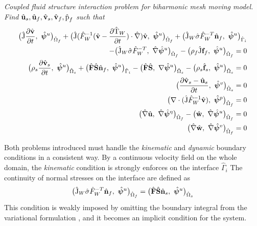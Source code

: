 \begin{prob}
\textit{Coupled fluid structure interaction problem for biharmonic mesh moving model.
Find $\hat{\mathbf{u}}_s, \hat{\mathbf{u}}_f, \hat{\mathbf{v}}_s, \hat{\mathbf{v}}_f, \text{\^{p}}_f $ such that}
\begin{align*}
\big(\text{\^{J}} \frac{\partial \hat{\mathbf{v}}}{\partial t}, \ \hat{\bm{\psi}}^u \big)_{\hat{\Omega}_f} +
\big(\text{\^{J}} (\hat{F}_W^{-1}(\hat{\mathbf{v}} - \frac{\partial \text{\^{T}}_W}{\partial t}) \cdot \hat{\nabla}) \hat{\mathbf{v}}, \ {\hat{\bm{\psi}}^u} \big)_{\hat{\Omega}_f}
+ \big(\text{\^{J}}_W \hat{\sigma}\hat{F}_W^{-T} \hat{\mathbf{n}}_f, \ {\hat{\bm{\psi}}^u} \big)_{\hat{\Gamma}_i} \\
- \big(\text{\^{J}}_W \hat{\sigma}\hat{F}_W^{-T}, \ {\hat{\nabla}\hat{\bm{\psi}}^u} \big)_{\hat{\Omega}_f} -
\big(\rho_f \text{\^{J}} \mathbf{f}_f, \ {{\hat{\bm{\psi}}^u}} \big)_{\hat{\Omega}_f} = 0 \\
\big(\rho_s \frac{\partial \hat{\mathbf{v}}_s}{\partial t}, \ {\hat{\bm{\psi}}^u} \big)_{\hat{\Omega}_s} + \big(\hat{\mathbf{F}}\hat{\mathbf{S}}\hat{\mathbf{n}}_f, \ {\hat{\bm{\psi}}^u} \big)_{\hat{\Gamma}_i}
- \big(\hat{\mathbf{F}}\hat{\mathbf{S}}, \ {\nabla \hat{\bm{\psi}}^u} \big)_{\hat{\Omega}_s} - \big(\rho_s \hat{\mathbf{f}}_s, \ {\hat{\bm{\psi}}^u} \big)_{\hat{\Omega}_s} = 0 \\
\big(\frac{\partial \hat{\mathbf{v}}_s - \hat{\mathbf{u}}_s}{\partial t}, \ {\hat{\bm{\psi}}^v} \big)_{\hat{\Omega}_s}  = 0\\
\big(\nabla \cdot (\text{\^{J}} \hat{F}_W^{-1} \hat{\mathbf{v}}), \ {\hat{\bm{\psi}}^p} \big)_{\hat{\Omega}_f} = 0 \\
\big(\hat{\nabla}\hat{\mathbf{u}}, \ {\hat{\nabla}\hat{\bm{\psi}}^{\eta}} \big)_{\hat{\Omega}_f} - 
\big(\hat{\mathbf{w}}, \ {\hat{\nabla}\hat{\bm{\psi}}^u} \big)_{\hat{\Omega}_f} = 0 \\
\big(\hat{\nabla}\hat{\mathbf{w}}, \ {\hat{\nabla}\hat{\bm{\psi}}^{v}} \big)_{\hat{\Omega}_f} = 0
\end{align*}
\end{prob}

Both problems introduced must handle the \textit{kinematic} and \textit{dynamic} boundary conditions in a consistent way. By a continuous velocity field on the whole domain, the \textit{kinematic} condition is strongly enforces on the interface $\hat{\Gamma}_i$
The continuity of normal stresses on the interface are defined as
\begin{align*}
 \big(\text{\^{J}}_W \hat{\sigma}\hat{F}_W^{-T} \hat{\mathbf{n}}_f, \ {\hat{\bm{\psi}}^u} \big)_{\hat{\Omega}_f} = 
  \big(\hat{\mathbf{F}}\hat{\mathbf{S}} \hat{\mathbf{n}}_s, \ {\hat{\bm{\psi}}^u} \big)_{\hat{\Omega}_s}
\end{align*}
This condition is weakly imposed by omitting the boundary integral from the variational formulation \cite{Wick}, and it becomes an implicit condition for the system. \\

